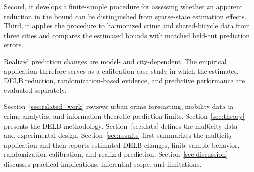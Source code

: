  Second, it develops a finite-sample
procedure for assessing whether an apparent reduction in the bound can be
distinguished from sparse-state estimation effects. Third, it applies the
procedure to harmonized crime and shared-bicycle data from three cities and
compares the estimated bounds with matched held-out prediction errors.

 Realized prediction changes are model- and city-dependent. The empirical
application therefore serves as
a calibration case study in which the estimated DELB reduction,
randomization-based evidence, and predictive performance are evaluated
separately.

Section~\ref{sec:related_work} reviews urban crime forecasting, mobility data
in crime analytics, and information-theoretic prediction limits.
Section~\ref{sec:theory} presents the DELB methodology. Section~\ref{sec:data}
defines the multicity data and experimental design. Section~\ref{sec:results}
first summarizes the multicity application and then reports estimated DELB
changes, finite-sample behavior, randomization calibration, and realized
prediction.
Section~\ref{sec:discussion} discusses practical implications, inferential
scope, and limitations.
